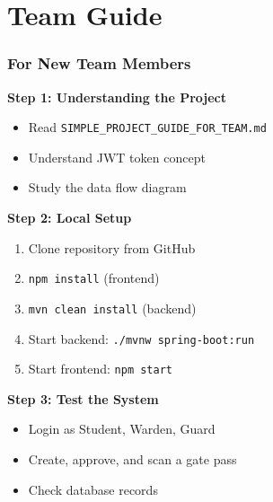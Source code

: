 \documentclass[11pt]{beamer}
\begin{document}
\section{Team Guide}

\begin{frame}
\frametitle{For New Team Members}

\textbf{Step 1: Understanding the Project}
\begin{itemize}
    \item Read \texttt{SIMPLE\_PROJECT\_GUIDE\_FOR\_TEAM.md}
    \item Understand JWT token concept
    \item Study the data flow diagram
\end{itemize}

\textbf{Step 2: Local Setup}
\begin{enumerate}
    \item Clone repository from GitHub
    \item \texttt{npm install} (frontend)
    \item \texttt{mvn clean install} (backend)
    \item Start backend: \texttt{./mvnw spring-boot:run}
    \item Start frontend: \texttt{npm start}
\end{enumerate}

\textbf{Step 3: Test the System}
\begin{itemize}
    \item Login as Student, Warden, Guard
    \item Create, approve, and scan a gate pass
    \item Check database records
\end{itemize}
\end{frame}
\end{document}
